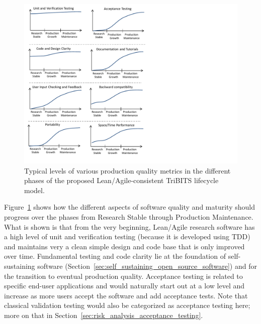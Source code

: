 \documentclass[11pt]{SANDreport}
\begin{document}
\begin{figure}
\begin{center}
\includegraphics[trim = 0.1in 0.1in 4.0in 0.1in, scale=0.85]
{ImprovementsInDevelopmentPhases}
{}\caption{Typical levels of various production quality metrics in the
different phases of the proposed Lean/Agile-consistent TriBITS
lifecycle model.}
\label{fig:ImprovementsInDevelopmentPhases}
\end{center}
\end{figure}

Figure~\ref{fig:ImprovementsInDevelopmentPhases} shows how the
different aspects of software quality and maturity should progress
over the phases from Research Stable through Production
Maintenance.  What is shown is that from the very beginning,
Lean/Agile research software has a high level of unit and verification
testing (because it is developed using TDD) and maintains very a clean
simple design and code base that is only improved over time.
Fundamental testing and code clarity lie at the foundation of
self-sustaining software
(Section~\ref{sec:self_sustaining_open_source_software}) and for the
transition to eventual production quality.  Acceptance testing is
related to specific end-user applications and would naturally start
out at a low level and increase as more users accept the
software and add acceptance tests.  Note that classical validation
testing would also be categorized as acceptance testing here; more on
that in Section~\ref{sec:risk_analysis_acceptance_testing}.
\end{document}
